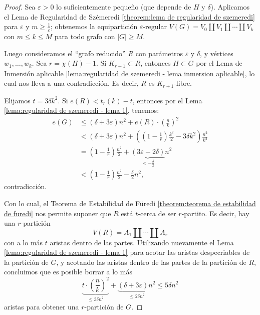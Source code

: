 \documentclass[12pt]{report}
\theoremstyle{plain}
\theoremstyle{definition}
\newcommand{\abs}[1]{\left \vert #1 \right \vert}
\begin{document}
\begin{proof}
Sea $\varepsilon > 0$ lo suficientemente pequeño (que depende de $H$ y $\delta$). Aplicamos el Lema de Regularidad de Szémeredi \ref{theorem:lema de regularidad de szemeredi} para $\varepsilon$ y $m \geq \frac 1 \varepsilon$; obtenemos la equipartición $\varepsilon$-regular $V(G) = V_0 \coprod V_1 \coprod \cdots \coprod V_k$ con $m \leq k \leq M$ para todo grafo con $\abs G \geq M$.

Luego consideramos el ``grafo reducido'' $R$ con parámetros $\varepsilon$ y $\delta$, y vértices $w_1, \ldots, w_k$. Sea $r = \chi (H) - 1$. Si $K_{r+1} \subset R$, entonces $H \subset G$ por el Lema de Inmersión aplicable \ref{lema:regularidad de szemeredi - lema inmersion aplicable}, lo cual nos lleva a una contradicción. Es decir, $R$ es $K_{r+1}$-libre.

Elijamos $t = 3 \delta k^2$. Si $e(R) < t_r (k)-t$, entonces por el Lema \ref{lema:regularidad de szemeredi - lema 1}, tenemos:
\begin{align*}
e(G) &\leq (\delta + 3 \varepsilon)n^2 + e(R) \cdot \left (\frac n k\right)^2 \\
    &< (\delta + 3 \varepsilon)n^2 + \left ( (1 - \frac 1 r) \frac{k^2}{2} - 3 \delta k^2 \right ) \frac{n^2}{k^2} \\
    &= (1 - \frac 1 r) \frac{n^ 2}{2} + \underbrace{(3 \varepsilon - 2 \delta)}_{< - \frac \delta 2} n^2 \\
    &<(1-\frac 1 r) \frac{n^2}{2} - \frac{\delta}{2} n^2,
\end{align*}
contradicción.

Con lo cual, el Teorema de Estabilidad de Füredi \ref{theorem:teorema de estabilidad de furedi} nos permite suponer que $R$ está $t$-cerca de ser $r$-partito. Es decir, hay una $r$-partición
\[
    V(R) = A_1 \coprod \cdots \coprod A_r
\]
con a lo más $t$ aristas dentro de las partes. Utilizando nuevamente el Lema \ref{lema:regularidad de szemeredi - lema 1} para acotar las aristas despecriables de la partición de $G$, y acotando las aristas dentro de las partes de la partición de $R$, concluimos que es posible borrar a lo más
\[
    \underbrace{t \cdot \left ( \frac n k \right )^2}_{\leq 3 \delta n^2} + \underbrace{(\delta + 3 \varepsilon)n^2}_{\leq 2 \delta n^2} \leq 5 \delta n^2
\]
aristas para obtener una $r$-partición de $G$.
\end{proof}


\bigskip
\end{document}
